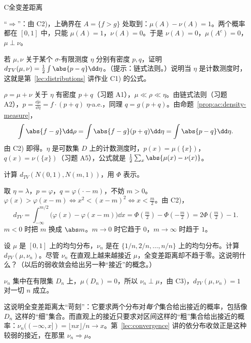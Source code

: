 \begin{probleme}{C}{全变差距离}
\begin{questions}
\begin{solution}
“$\Rightarrow$”：由 C2)，上确界在 $A=\{f>g\}$ 处取到：$\mu(A)-\nu(A)=1$。两个概率都在 $[0,1]$ 中，只能 $\mu(A)=1$，$\nu(A)=0$。于是 $\nu(A)=0$，$\mu(A^c)=0$，$\mu\perp\nu$。
\end{solution}
\item 若 $\mu,\nu$ 关于某个 $\sigma$-有限测度 $\eta$ 分别有密度 $p,q$，证明 $d_{TV}(\mu,\nu)=\frac12\int\abs{p-q}\dd\eta$。（提示：链式法则。）说明当 $\eta$ 是计数测度时，这就是第~\ref{lec:distributions} 讲作业 C1) 的公式。
\begin{solution}
$\rho=\mu+\nu$ 关于 $\eta$ 有密度 $p+q$（习题 A1），$\mu\ll\rho\ll\eta$。由链式法则（习题 A2），$p=\frac{\dd\mu}{\dd\eta}=f\cdot(p+q)$ $\eta$-a.e.，同理 $q=g(p+q)$。由命题~\ref{prop:ac:density-measure}，
\[
\int\abs{f-g}\dd\rho=\int\abs{f-g}(p+q)\dd\eta=\int\abs{p-q}\dd\eta .
\]
由 C2) 即得。$\eta$ 是可数集 $D$ 上的计数测度时，$p(x)=\mu(\{x\})$，$q(x)=\nu(\{x\})$（习题 A5），公式就是 $\frac12\sum_x\abs{\mu(x)-\nu(x)}$。
\end{solution}
\item 计算 $d_{TV}(N(0,1),N(m,1))$，用 $\Phi$ 表示。
\begin{solution}
取 $\eta=\lambda$，$p=\varphi$，$q=\varphi(\cdot-m)$，不妨 $m>0$。$\varphi(x)>\varphi(x-m)\iff x^2<(x-m)^2\iff x<\frac m2$。由 C2)，
\[
d_{TV}=\int_{-\infty}^{m/2}\bigl(\varphi(x)-\varphi(x-m)\bigr)\dd x=\Phi(\tfrac m2)-\Phi(-\tfrac m2)=2\Phi(\tfrac m2)-1 .
\]
$m<0$ 时把 $m$ 换成 $\abs m$。$m\to0$ 时它趋于 $0$，$m\to\infty$ 时趋于 $1$。
\end{solution}
\item 设 $\mu$ 是 $[0,1]$ 上的均匀分布，$\nu_n$ 是在 $\{1/n,2/n,\dots,n/n\}$ 上的均匀分布。计算 $d_{TV}(\mu,\nu_n)$。尽管 $\nu_n$ 在直观上越来越接近 $\mu$，全变差距离却不趋于零。这说明什么？（以后的弱收敛会给出另一种“接近”的概念。）
\begin{solution}
$\nu_n$ 集中在有限集 $D_n$ 上，$\mu(D_n)=0$，所以 $\nu_n\perp\mu$，由 C3)，$d_{TV}(\mu,\nu_n)=1$ 对一切 $n$ 成立。

这说明全变差距离太“苛刻”：它要求两个分布对\emph{每个}集合给出接近的概率，包括像 $D_n$ 这样的“细”集合。而直观上的接近只要求对区间这样的“粗”集合给出接近的概率：$\nu_n((-\infty,x])=\lfloor nx\rfloor/n\to x$。第~\ref{lec:convergence} 讲的依分布收敛正是这种较弱的接近，在那里 $\nu_n\Rightarrow\mu$。
\end{solution}
\end{questions}
\end{probleme}

\thinkingpart

